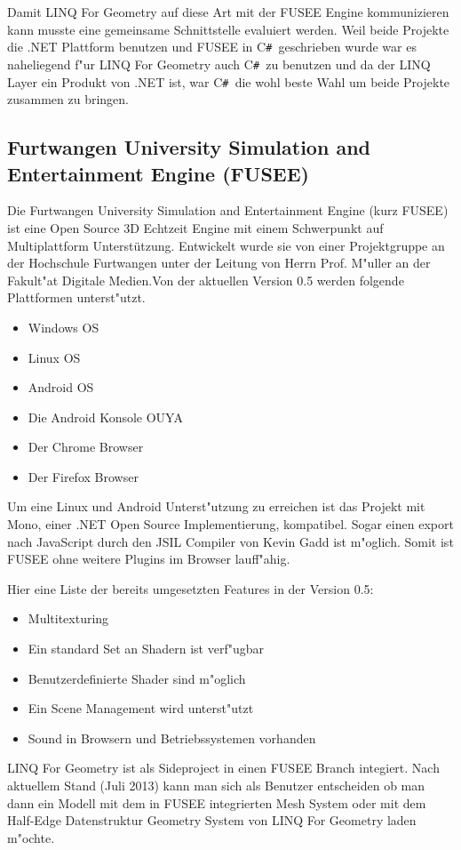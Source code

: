 \documentclass[pagesize, paper=a4, fontsize=12pt,titlepage=true, headings=small, headnosepline, abstractoff, liststotoc, nochapterprefix, plainheadsepline]{scrreprt}
\newcommand{\CSS}{C\texttt{\# }}
\newcommand{\LFGS}{LINQ For Geometry }
\newcommand{\HES}{Half-Edge Datenstruktur }
\begin{document}
Damit \LFGS auf diese Art mit der FUSEE Engine kommunizieren kann musste eine gemeinsame Schnittstelle evaluiert werden. Weil beide Projekte die .NET Plattform benutzen und FUSEE in \CSS geschrieben wurde war es naheliegend f"ur \LFGS auch \CSS zu benutzen und da der LINQ Layer ein Produkt von .NET ist, war \CSS die wohl beste Wahl um beide Projekte zusammen zu bringen.
		\subsection {Furtwangen University Simulation and Entertainment Engine (FUSEE)}
			Die Furtwangen University Simulation and Entertainment Engine (kurz FUSEE) ist eine Open Source 3D Echtzeit Engine mit einem Schwerpunkt auf Multiplattform Unterstützung. Entwickelt wurde sie von einer Projektgruppe an der Hochschule Furtwangen unter der Leitung von Herrn Prof. M"uller an der Fakult"at Digitale Medien.Von der aktuellen Version 0.5 werden folgende Plattformen unterst"utzt.
\begin{itemize}
\item Windows OS
\item Linux OS
\item Android OS
\item Die Android Konsole OUYA
\item Der Chrome Browser
\item Der Firefox Browser
\end{itemize}

Um eine Linux und Android Unterst"utzung zu erreichen ist das Projekt mit Mono, einer .NET Open Source Implementierung, kompatibel. Sogar einen export nach JavaScript durch den JSIL Compiler von Kevin Gadd ist m"oglich. Somit ist FUSEE ohne weitere Plugins im Browser lauff"ahig.

Hier eine Liste der bereits umgesetzten Features in der Version 0.5:
\begin{itemize}
\item Multitexturing
\item Ein standard Set an Shadern ist verf"ugbar
\item Benutzerdefinierte Shader sind m"oglich
\item Ein Scene Management wird unterst"utzt
\item Sound in Browsern und Betriebssystemen vorhanden
\end{itemize}

\LFGS ist als Sideproject in einen FUSEE Branch integiert. Nach aktuellem Stand (Juli 2013) kann man sich als Benutzer entscheiden ob man dann ein Modell mit dem in FUSEE integrierten Mesh System oder mit dem \HES Geometry System von \LFGS laden m"ochte.
\end{document}
